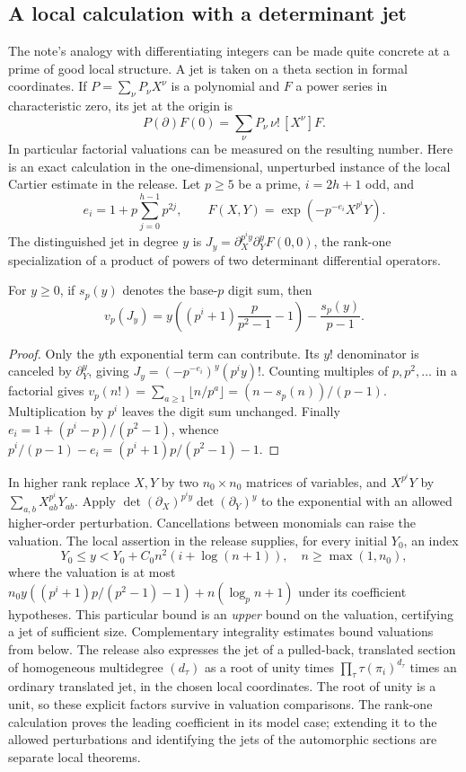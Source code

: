 \documentclass[11pt,a4paper]{article}
\theoremstyle{definition}\newtheorem{arithinput}[theorem]{Arithmetic input}
\begin{document}
\subsection{A local calculation with a determinant jet}
The note's analogy with differentiating integers can be made quite concrete at a prime of good local structure. A jet is taken on a theta section in formal coordinates. If $P=\sum_\nu P_\nu X^\nu$ is a polynomial and $F$ a power series in characteristic zero, its jet at the origin is
\[
 P(\partial)F(0)=\sum_\nu P_\nu\,\nu!\,[X^\nu]F .
\]
In particular factorial valuations can be measured on the resulting number. Here is an exact calculation in the one-dimensional, unperturbed instance of the local Cartier estimate in the release. Let $p\ge5$ be a prime, $i=2h+1$ odd, and
\[
 e_i=1+p\sum_{j=0}^{h-1}p^{2j},\qquad
 F(X,Y)=\exp(-p^{-e_i}X^{p^i}Y).
\]
The distinguished jet in degree $y$ is $J_y=\partial_X^{p^iy}\partial_Y^y F(0,0)$, the rank-one specialization of a product of powers of two determinant differential operators.
\begin{lemma}
For $y\ge0$, if $s_p(y)$ denotes the base-$p$ digit sum, then
\[
 v_p(J_y)=y\left((p^i+1)\frac{p}{p^2-1}-1\right)-\frac{s_p(y)}{p-1}.
\]
\end{lemma}
\begin{proof}
Only the $y$th exponential term can contribute. Its $y!$ denominator is canceled by $\partial_Y^y$, giving $J_y=(-p^{-e_i})^y(p^iy)!$. Counting multiples of $p,p^2,\ldots$ in a factorial gives $v_p(n!)=\sum_{a\ge1}\lfloor n/p^a\rfloor=(n-s_p(n))/(p-1)$. Multiplication by $p^i$ leaves the digit sum unchanged. Finally $e_i=1+(p^i-p)/(p^2-1)$, whence $p^i/(p-1)-e_i=(p^i+1)p/(p^2-1)-1$.
\end{proof}
In higher rank replace $X,Y$ by two $n_0\times n_0$ matrices of variables, and $X^{p^i}Y$ by $\sum_{a,b}X_{ab}^{p^i}Y_{ab}$. Apply $\det(\partial_X)^{p^iy}\det(\partial_Y)^y$ to the exponential with an allowed higher-order perturbation. Cancellations between monomials can raise the valuation. The local assertion in the release supplies, for every initial $Y_0$, an index
\[
 Y_0\le y<Y_0+C_0 n^2(i+\log(n+1)),\quad n\ge\max(1,n_0),
\]
where the valuation is at most
$n_0y((p^i+1)p/(p^2-1)-1)+n(\log_p n+1)$ under its coefficient hypotheses. This particular bound is an \emph{upper} bound on the valuation, certifying a jet of sufficient size. Complementary integrality estimates bound valuations from below. The release also expresses the jet of a pulled-back, translated section of homogeneous multidegree $(d_\tau)$ as a root of unity times $\prod_\tau\tau(\pi_i)^{d_\tau}$ times an ordinary translated jet, in the chosen local coordinates. The root of unity is a unit, so these explicit factors survive in valuation comparisons. The rank-one calculation proves the leading coefficient in its model case; extending it to the allowed perturbations and identifying the jets of the automorphic sections are separate local theorems.
\end{document}

